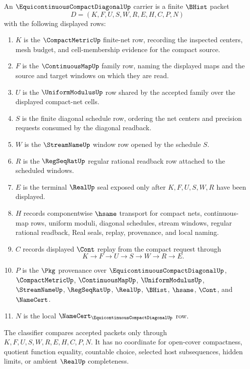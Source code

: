 \begin{definition}
\label{def:equicontinuous-compact-diagonal-carrier}
An $\EquicontinuousCompactDiagonalUp$ carrier is a finite $\BHist$ packet
$$
D=(K,F,U,S,W,R,E,H,C,P,N)
$$
with the following displayed rows:
\begin{enumerate}
\item $K$ is the $\CompactMetricUp$ finite-net row, recording the inspected centers, mesh budget, and cell-membership evidence for the compact source.
\item $F$ is the $\ContinuousMapUp$ family row, naming the displayed maps and the source and target windows on which they are read.
\item $U$ is the $\UniformModulusUp$ row shared by the accepted family over the displayed compact-net cells.
\item $S$ is the finite diagonal schedule row, ordering the net centers and precision requests consumed by the diagonal readback.
\item $W$ is the $\StreamNameUp$ window row opened by the schedule $S$.
\item $R$ is the $\RegSeqRatUp$ regular rational readback row attached to the scheduled windows.
\item $E$ is the terminal $\RealUp$ seal exposed only after $K,F,U,S,W,R$ have been displayed.
\item $H$ records componentwise $\hsame$ transport for compact nets, continuous-map rows, uniform moduli, diagonal schedules, stream windows, regular rational readback, Real seals, replay, provenance, and local naming.
\item $C$ records displayed $\Cont$ replay from the compact request through
$$
K\longrightarrow F\longrightarrow U\longrightarrow S\longrightarrow W\longrightarrow R\longrightarrow E .
$$
\item $P$ is the $\Pkg$ provenance over $\EquicontinuousCompactDiagonalUp$, $\CompactMetricUp$, $\ContinuousMapUp$, $\UniformModulusUp$, $\StreamNameUp$, $\RegSeqRatUp$, $\RealUp$, $\BHist$, $\hsame$, $\Cont$, and $\NameCert$.
\item $N$ is the local $\NameCert_{\EquicontinuousCompactDiagonalUp}$ row.
\end{enumerate}
The classifier compares accepted packets only through $K,F,U,S,W,R,E,H,C,P,N$. It has no coordinate for open-cover compactness, quotient function equality, countable choice, selected host subsequences, hidden limits, or ambient $\RealUp$ completeness.
\end{definition}

